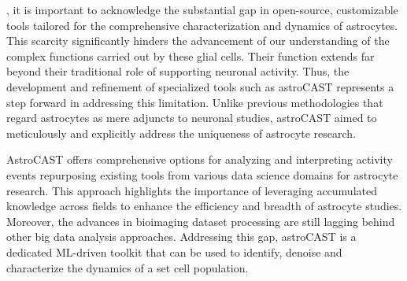, it is important to acknowledge the substantial gap in open-source, customizable tools tailored for the comprehensive characterization and dynamics of astrocytes. This scarcity significantly hinders the advancement of our understanding of the complex functions carried out by these glial cells. Their function extends far beyond their traditional role of supporting neuronal activity\citep{montalant_role_2021,ransom_new_2003}. Thus, the development and refinement of specialized tools such as astroCAST represents a step forward in addressing this limitation. Unlike previous methodologies that regard astrocytes as mere adjuncts to neuronal studies, astroCAST aimed to meticulously and explicitly address the uniqueness of astrocyte research.

AstroCAST offers comprehensive options for analyzing and interpreting activity events repurposing existing tools from various data science domains for astrocyte research. This approach highlights the importance of leveraging accumulated knowledge across fields to enhance the efficiency and breadth of astrocyte studies. Moreover, the advances in bioimaging dataset processing are still lagging behind other big data analysis approaches. Addressing this gap, astroCAST is a dedicated ML-driven toolkit that can be used to identify, denoise and characterize the dynamics of a set cell population.

